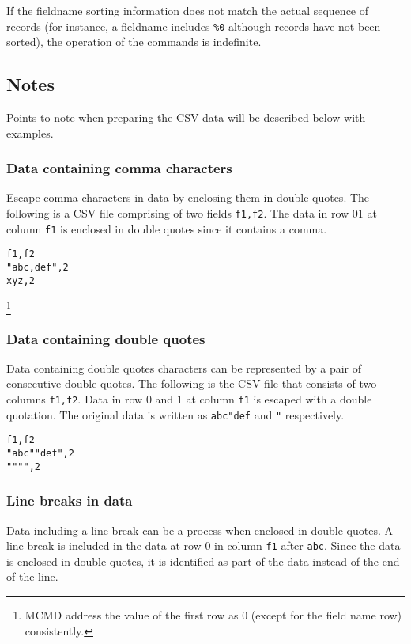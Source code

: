 If the fieldname sorting information does not match the actual sequence of records (for instance, a fieldname includes \verb|%0| although records have not been sorted), the operation of the commands is indefinite.

\subsection{Notes}
Points to note when preparing the CSV data will be described below with examples.

\subsubsection{Data containing comma characters}
Escape comma characters in data by enclosing them in double quotes.
The following is a CSV file comprising of two fields \verb|f1,f2|. 
The data in row 01 at column \verb|f1| is enclosed in double quotes since it contains a comma.

\begin{Verbatim}[baselinestretch=0.7,frame=single]
f1,f2
"abc,def",2
xyz,2
\end{Verbatim}
\footnote{MCMD address the value of the first row as 0 (except for the field name row) consistently.}

\subsubsection{Data containing double quotes}
Data containing double quotes characters can be represented by a pair of consecutive double quotes. The following is the CSV file that consists of two columns \verb|f1,f2|. Data in row 0 and 1 at column \verb|f1| is escaped with a double quotation. The original data is written as \verb|abc"def| and \verb|"| respectively.

\begin{Verbatim}[baselinestretch=0.7,frame=single]
f1,f2
"abc""def",2
"""",2
\end{Verbatim}

\subsubsection{Line breaks in data}
Data including a line break can be a process when enclosed in double quotes. A line break is included in the data at row 0 in column \verb|f1| after \verb|abc|. Since the data is enclosed in double quotes, it is identified as part of the data instead of the end of the line.

